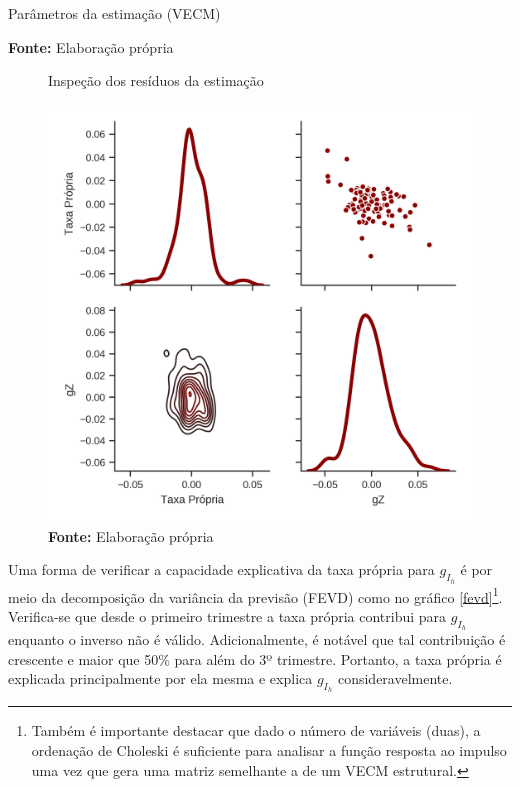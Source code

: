 \begin{table}[H]
	\centering
	\caption{Parâmetros da estimação (VECM)}
	
	\caption*{\textbf{Fonte:} Elaboração própria}
\end{table}

\begin{figure}[H]
	\centering
	\caption{Inspeção dos resíduos da estimação}
	\label{residuos}
	\includegraphics[height=.4\textheight]{../../Modelo/SeriesTemporais/figs/Residuos_4VECM.png}
	\caption*{\textbf{Fonte:} Elaboração própria}
\end{figure}




Uma forma de verificar a capacidade explicativa da taxa própria para $g_{I_h}$ é por meio da decomposição da variância da previsão (FEVD) como no gráfico \ref{fevd}\footnote{Também é importante destacar que dado o número de variáveis (duas), a ordenação de Choleski é suficiente para analisar a função resposta ao impulso uma vez que gera uma matriz semelhante a de um VECM estrutural. 
}. Verifica-se que desde o primeiro trimestre a taxa própria contribui para $g_{I_h}$ enquanto o inverso não é válido. Adicionalmente, é notável que tal contribuição é crescente e maior que 50\% para além do 3º trimestre. Portanto, a taxa própria é explicada principalmente por ela mesma e explica $g_{I_h}$ consideravelmente.

